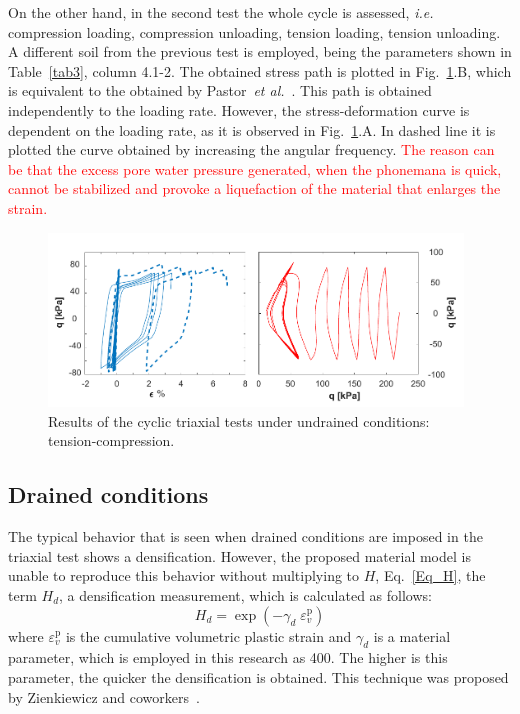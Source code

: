 \documentclass[preprint,12pt,a4paper]{elsarticle}
\begin{document}
On the other hand, in the second test the whole cycle is assessed, \textit{i.e.} compression loading, compression unloading, tension loading, tension unloading. A different soil from the previous test is employed, being the parameters shown in Table~\ref{tab3}, column 4.1-2. The obtained stress path  is plotted in Fig.~\ref{fig_c_undrained2}.B, which is equivalent to the obtained by Pastor~\textit{et al.}~\cite{PastorZC:90}.  This path is obtained independently to the loading rate. However, the stress-deformation curve is dependent on the loading rate, as it is observed in Fig.~\ref{fig_c_undrained2}.A. In dashed line it is plotted the curve obtained by increasing the angular frequency. \textcolor{red}{The reason can be that the excess pore water pressure generated,  when the phonemana is quick, cannot be stabilized and provoke a liquefaction of the material that enlarges the strain.}

\begin{figure}
\centering
\includegraphics[width=0.98\textwidth]{Figs/ciclo_undrained_2.pdf}
\caption{Results of the cyclic triaxial tests under undrained conditions: tension-compression.}
\label{fig_c_undrained2}
\end{figure}


\subsection{Drained conditions}
\label{subsec:42}
The typical behavior that is seen when drained conditions are imposed in the triaxial test shows a densification. However, the proposed material model is unable to reproduce this behavior without multiplying to $H$, Eq.~\eqref{Eq_H}, the term $H_d$, a densification measurement, which is calculated as follows:
\begin{equation}
H_{d}=\exp \left(-\gamma_{d} \; \varepsilon_{v}^{\mathrm{p}} \right)
\end{equation}
where $\varepsilon_{v}^{\mathrm{p}}$ is the cumulative volumetric plastic strain and $\gamma_{d}$ is a material parameter, which is employed in this research as 400. The higher is this parameter, the quicker the densification is obtained. This technique was proposed by Zienkiewicz and coworkers~\cite{Zienkiewicz99}.
\end{document}
